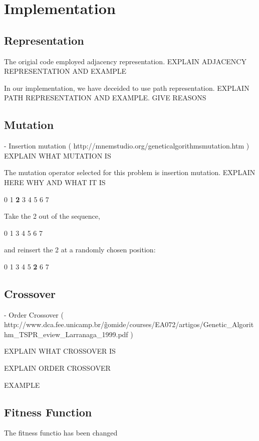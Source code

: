 \section{Implementation}

\subsection{Representation}
The origial code employed adjacency representation. EXPLAIN ADJACENCY REPRESENTATION AND EXAMPLE

In our implementation, we have deceided to use path representation. EXPLAIN PATH REPRESENTATION AND EXAMPLE. GIVE REASONS

\subsection{Mutation}
    - Insertion mutation ( http://mnemstudio.org/genetic\-algorithms\-mutation.htm )
 EXPLAIN WHAT MUTATION IS
 
 The mutation operator selected for this problem is insertion mutation. EXPLAIN HERE WHY AND WHAT IT IS


0 1 \textbf{2} 3 4 5 6 7

Take the 2 out of the sequence,

0 1 3 4 5 6 7

and reinsert the 2 at a randomly chosen position:

0 1 3 4 5 \textbf{2} 6 7

\subsection{Crossover}
  - Order Crossover ( http://www.dca.fee.unicamp.br/\~gomide/courses/EA072/artigos/Genetic\_Algorithm\_TSPR\_eview\_Larranaga\_1999.pdf )

  EXPLAIN WHAT CROSSOVER IS

  EXPLAIN ORDER CROSSOVER

  EXAMPLE

\subsection{Fitness Function}
The fitness functio has been changed 